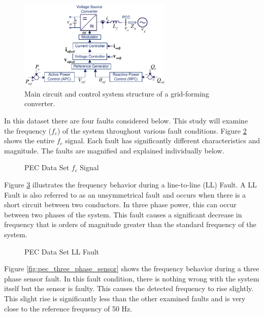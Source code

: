 \begin{figure}[H]
	\includegraphics[width=0.65\textwidth]{Images/GFMSchema.pdf}
	\caption{Main circuit and control system structure of a grid-forming converter.}
	\label{fig:sys}
\end{figure}


In this dataset there are four faults considered below. This study will examine the frequency ($f_c$) of the system throughout various fault conditions. Figure \ref{fig:pec_all} shows the entire $f_c$ signal. Each fault has significantly different characteristics and magnitude. The faults are magnified and explained individually below.

\begin{figure}[H]
    
    \caption{PEC Data Set $f_c$ Signal}
    \label{fig:pec_all}
\end{figure}

Figure \ref{fig:pec_ll_fault} illustrates the frequency behavior during a line-to-line (LL) Fault. A LL Fault is also referred to as an unsymmetrical fault and occurs when there is a short circuit between two conductors. In three phase power, this can occur between two phases of the system. This fault causes a significant decrease in frequency that is orders of magnitude greater than the standard frequency of the system. 

\begin{figure}[H]
    
    \caption{PEC Data Set LL Fault}
    \label{fig:pec_ll_fault}
\end{figure}

Figure \ref{fig:pec_three_phase_sensor} shows the frequency behavior during a three phase sensor fault. In this fault condition, there is nothing wrong with the system itself but the sensor is faulty. This causes the detected frequency to rise slightly. This slight rise is significantly less than the other examined faults and is very close to the reference frequency of 50 Hz. 

